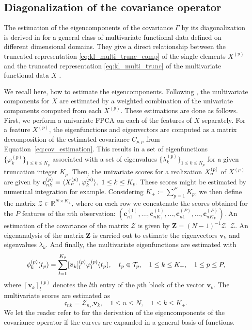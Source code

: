 \subsection{Diagonalization of the covariance operator} %
\label{sub:by_diagonalization_of_the_covariance_operator}

The estimation of the eigencomponents of the covariance $\Gamma$ by its diagonalization is derived in \cite{happMultivariateFunctionalPrincipal2018a} for a general class of multivariate functional data defined on different dimensional domains. They give a direct relationship between the truncated representation \eqref{eq:kl_multi_trunc_comp} of the single elements $X^{(p)}$ and the truncated representation \eqref{eq:kl_multi_trunc} of the multivariate functional data $X$ \cite[see][Prop.~5]{happMultivariateFunctionalPrincipal2018a}.

We recall here, how to estimate the eigencomponents. Following \citet[Prop.~5]{happMultivariateFunctionalPrincipal2018a}, the multivariate components for $X$ are estimated by a weighted combination of the univariate components computed from each $X^{(p)}$. These estimations are done as  follows. First, we perform a univariate FPCA on each of the features of $X$ separately. For a feature $X^{(p)}$, the eigenfunctions and eigenvectors are computed as a matrix decomposition of the estimated covariance $C_{p, p}$ from Equation~\eqref{eq:cov_estimation}. This results in a set of eigenfunctions $\{\varphi_k^{(p)}\}_{1 \leq k \leq K_p}$ associated with a set of eigenvalues $\{\lambda_k^{(p)}\}_{1 \leq k \leq K_p}$ for a given truncation integer $K_p$. Then, the univariate scores for a realization $X_n^{(p)}$ of $X^{(p)}$ are given by $\mathbf{c}_{nk}^{(p)} = \langle X_n^{(p)}, \varphi_k^{(p)}\rangle, ~1 \leq k \leq K_p$. These scores might be estimated by numerical integration for example. Considering $K_+ \coloneqq \sum_{p = 1}^P K_p$, we then define the matrix $\mathcal{Z} \in \mathbb{R}^{N \times K_+}$, where on each row we concatenate the scores obtained for the $P$ features of the $n$th observation: 
$(\mathbf{c}_{n1}^{(1)}, \ldots, \mathbf{c}_{nK_1}^{(1)}, \ldots, \mathbf{c}_{n1}^{(P)}, \ldots, \mathbf{c}_{nK_P}^{(P)})$. An estimation of the covariance of the matrix $\mathcal{Z}$ is given by $\mathbf{Z} = (N - 1)^{-1}\mathcal{Z}^\top\mathcal{Z}$. An eigenanalysis of the matrix $\mathbf{Z}$ is carried out to estimate the eigenvectors $\boldsymbol{v}_k$ and eigenvalues $\lambda_k$. And finally, the multivariate eigenfunctions are estimated with
\begin{equation*}
\phi_k^{(p)}(t_p) = \sum_{l = 1}^{K_p}[\boldsymbol{v}_k]_{l}^{(p)}\varphi_{l}^{(p)}(t_p),\quad t_p \in \mathcal{T}_{p},\quad 1 \leq k \leq K_+,\quad 1 \leq p \leq P,
\end{equation*}
where $[\boldsymbol{v}_k]^{(p)}_{l}$ denotes the $l$th entry of the $p$th block of the vector $\boldsymbol{v}_k$. The multivariate scores are estimated as
$$\mathfrak{c}_{nk} = \mathcal{Z}_{{n,\cdot}}\boldsymbol{v}_k, \quad 1 \leq n \leq N, \quad 1 \leq k \leq K_+.$$
We let the reader refer to \cite{happMultivariateFunctionalPrincipal2018a} for the derivation of the eigencomponents of the covariance operator if the curves are expanded in a general basis of functions.

